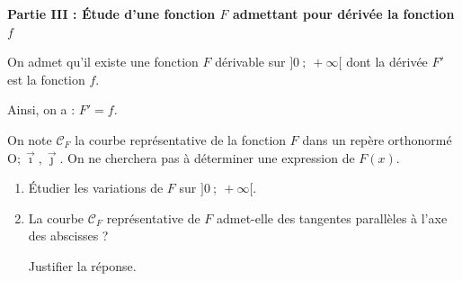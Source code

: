 \documentclass[10pt]{article}
\providecommand{\Oij}{\(\mathrm{O};\vec{\imath},\vec{\jmath}\)}
\begin{document}
\bigskip

\textbf{Partie III : Étude d'une fonction \boldmath $F$\unboldmath{} admettant pour dérivée la fonction \boldmath $f$\unboldmath}

\medskip

On admet qu'il existe une fonction $F$ dérivable sur $]0~;~ +\infty[$ dont la dérivée $F'$ est la fonction $f$.

Ainsi, on a : $F' = f$.

On note $\mathcal{C}_F$ la courbe représentative de la fonction $F$ dans un repère orthonormé \Oij. On ne cherchera pas à déterminer une expression de $F(x)$.

\medskip

\begin{enumerate}
\item Étudier les variations de $F$ sur $]0~;~ +\infty[$.
\item La courbe $\mathcal{C}_F$ représentative  de $F$ admet-elle des tangentes parallèles à l'axe des abscisses ?

Justifier la réponse.
\end{enumerate}
\end{document}

